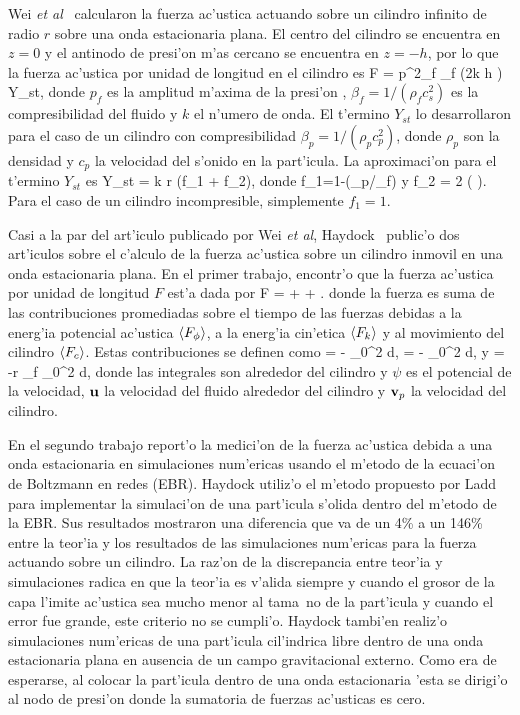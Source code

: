 Wei {\it et al}~\cite{wei04} calcularon la fuerza ac'ustica actuando sobre un cilindro infinito de radio $r$ sobre
una onda estacionaria plana.
El centro del cilindro se encuentra en $z=0$ y el antinodo de presi'on m'as cercano 
se encuentra en $z=-h$, por lo que la fuerza ac'ustica por unidad de longitud en el cilindro es
\BE\label{eq:force-wei} 
F = p^2_f \beta_f \sin (2k h ) Y_{st},
\EE
donde $p_f$ es la amplitud m'axima de la presi'on , $\beta_f=1/(\rho_f c_s^2)$ es la compresibilidad del fluido y $k$
el n'umero de onda. 
El t'ermino $Y_{st}$ lo desarrollaron para el caso de un cilindro con compresibilidad 
$\beta_p=1/(\rho_p c_p^2)$, donde $\rho_p$ son la densidad  y  $c_p$ la velocidad del s'onido en la part'icula. 
La aproximaci'on para el t'ermino $Y_{st}$ es
\BE
Y_{st} = \pi k r (f_1 + f_2),
\EE
donde 
\BE
f_1=1-(\beta_p/\beta_f)
\EE 
y
\BE
f_2 = 2 \left(  \right).
\EE
Para el caso de un cilindro incompresible, simplemente $f_1 = 1$. 

Casi a la par del art'iculo publicado por Wei {\it et al}, Haydock~\cite{haydock05,haydock05b} public'o dos
art'iculos sobre el c'alculo  de la fuerza ac'ustica  sobre un cilindro inmovil en una onda estacionaria plana. 
En el primer trabajo, encontr'o que la fuerza ac'ustica por unidad de longitud $F$ est'a dada por
\BE
F =   +  + .
\EE
donde la fuerza  es suma de las contribuciones promediadas sobre el tiempo de las fuerzas debidas a la energ'ia potencial ac'ustica 
$\left\langle F_\phi\right\rangle$, a la energ'ia cin'etica $\left\langle F_k\right\rangle$ y al movimiento del cilindro $\left\langle F_c\right\rangle$. Estas contribuciones se
definen como
\BE
{} = - \int_0^{2\pi}  \cos \theta d\theta,
\EE
\BE
{} = - \int_0^{2\pi}  \cos \theta d\theta,
\EE
y
\BE
{} = -r \rho_f \int_0^{2\pi}  \cos \theta d\theta,
\EE
donde las integrales son alrededor del cilindro y  
$\psi$ es el potencial de la velocidad, $\textbf u$ la velocidad del fluido alrededor del cilindro
y $\textbf v_p$ la velocidad del cilindro. 

En el segundo trabajo  report'o la medici'on de la fuerza ac'ustica debida a una onda estacionaria en simulaciones num'ericas
usando el m'etodo de la ecuaci'on de Boltzmann en redes (EBR). Haydock utiliz'o el m'etodo propuesto por Ladd~\cite{ladd94} para
implementar la simulaci'on de una part'icula s'olida dentro del m'etodo de la EBR. Sus resultados mostraron una diferencia
que va de un 4\% a un 146\%  entre la teor'ia y los resultados de las simulaciones num'ericas para la fuerza actuando sobre 
un cilindro.  La raz'on de la discrepancia entre teor'ia y
simulaciones radica en que la teor'ia es v'alida siempre y cuando el grosor de la capa l'imite ac'ustica sea mucho menor
al tama~no de la part'icula y cuando el error fue grande, este criterio no se cumpli'o. Haydock tambi'en realiz'o
simulaciones num'ericas de una part'icula cil'indrica libre dentro de una onda estacionaria plana en ausencia de un campo
gravitacional externo. Como era de esperarse, al colocar la part'icula dentro de una onda estacionaria 
'esta se dirigi'o al nodo de presi'on donde la sumatoria de fuerzas ac'usticas es cero.

